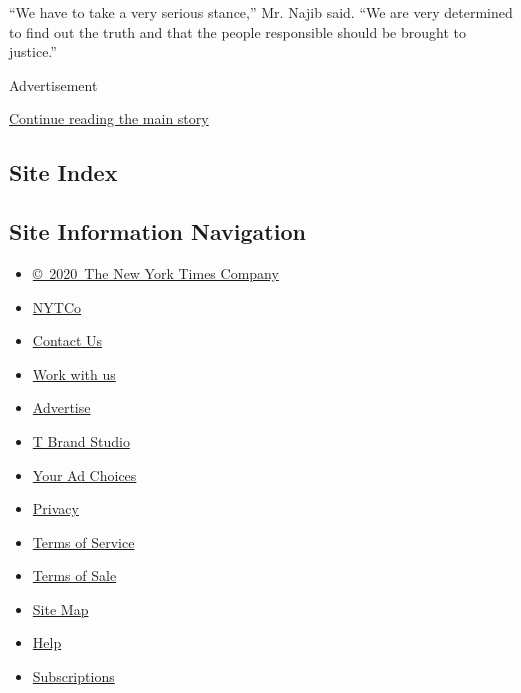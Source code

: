 ``We have to take a very serious stance,'' Mr. Najib said. ``We are very
determined to find out the truth and that the people responsible should
be brought to justice.''

Advertisement

\protect\hyperlink{after-bottom}{Continue reading the main story}

\hypertarget{site-index}{%
\subsection{Site Index}\label{site-index}}

\hypertarget{site-information-navigation}{%
\subsection{Site Information
Navigation}\label{site-information-navigation}}

\begin{itemize}
\tightlist
\item
  \href{https://help.nytimes.com/hc/en-us/articles/115014792127-Copyright-notice}{©~2020~The
  New York Times Company}
\end{itemize}

\begin{itemize}
\tightlist
\item
  \href{https://www.nytco.com/}{NYTCo}
\item
  \href{https://help.nytimes.com/hc/en-us/articles/115015385887-Contact-Us}{Contact
  Us}
\item
  \href{https://www.nytco.com/careers/}{Work with us}
\item
  \href{https://nytmediakit.com/}{Advertise}
\item
  \href{http://www.tbrandstudio.com/}{T Brand Studio}
\item
  \href{https://www.nytimes.com/privacy/cookie-policy\#how-do-i-manage-trackers}{Your
  Ad Choices}
\item
  \href{https://www.nytimes.com/privacy}{Privacy}
\item
  \href{https://help.nytimes.com/hc/en-us/articles/115014893428-Terms-of-service}{Terms
  of Service}
\item
  \href{https://help.nytimes.com/hc/en-us/articles/115014893968-Terms-of-sale}{Terms
  of Sale}
\item
  \href{https://spiderbites.nytimes.com}{Site Map}
\item
  \href{https://help.nytimes.com/hc/en-us}{Help}
\item
  \href{https://www.nytimes.com/subscription?campaignId=37WXW}{Subscriptions}
\end{itemize}
